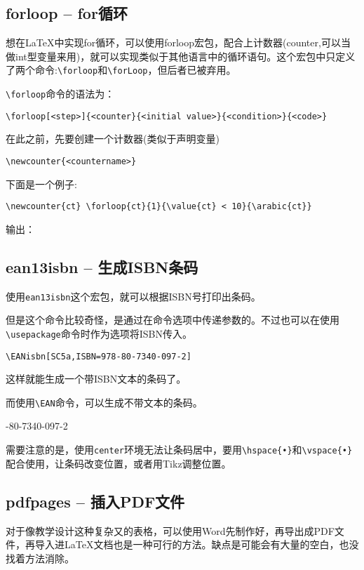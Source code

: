\subsection{forloop -- for循环}
想在\LaTeX 中实现for循环，可以使用forloop宏包，配合上计数器(counter,可以当做int型变量来用)，就可以实现类似于其他语言中的循环语句。这个宏包中只定义了两个命令:\lstinline|\forloop|和\lstinline|\forLoop|，但后者已被弃用。

\verb|\forloop|命令的语法为：
\begin{lstlisting}
\forloop[<step>]{<counter}{<initial value>}{<condition>}{<code>}
\end{lstlisting}
在此之前，先要创建一个计数器(类似于声明变量)
\begin{lstlisting}
\newcounter{<countername>}
\end{lstlisting}
下面是一个例子:
\begin{lstlisting}
\newcounter{ct} \forloop{ct}{1}{\value{ct} < 10}{\arabic{ct}}
\end{lstlisting}
输出： 

\subsection{ean13isbn -- 生成ISBN条码}
使用\lstinline|ean13isbn|这个宏包，就可以根据ISBN号打印出条码。

但是这个命令比较奇怪，是通过在命令选项中传递参数的。不过也可以在使用\lstinline|\usepackage|命令时作为选项将ISBN传入。

\lstinline|\EANisbn[SC5a,ISBN=978-80-7340-097-2]|

这样就能生成一个带ISBN文本的条码了。
\begin{center}
	\hspace{1cm}\EANisbn[SC5a,ISBN=978-80-7340-097-2]
\end{center}
而使用\lstinline|\EAN|命令，可以生成不带文本的条码。
\begin{center}
	\hspace{1cm}-80-7340-097-2
\end{center}

需要注意的是，使用\lstinline|center|环境无法让条码居中，要用\lstinline|\hspace{•}|和\lstinline|\vspace{•}|配合使用，让条码改变位置，或者用Tikz调整位置。

\subsection{pdfpages -- 插入PDF文件}
对于像教学设计这种复杂又的表格，可以使用Word先制作好，再导出成PDF文件，再导入进\LaTeX 文档也是一种可行的方法。缺点是可能会有大量的空白，也没找着方法消除。

